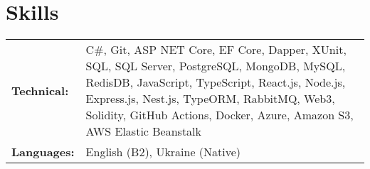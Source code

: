 \section{Skills}\label{sec:skills}

\begin{tabular}{p{}p{}}
    \textbf{Technical:}
    & C\#, Git, ASP NET Core, EF Core, Dapper, XUnit, SQL, SQL Server, PostgreSQL, MongoDB, MySQL, RedisDB,
    JavaScript, TypeScript, React.js, Node.js, Express.js, Nest.js, TypeORM, RabbitMQ,
    Web3, Solidity,
    GitHub Actions, Docker, Azure, Amazon S3, AWS Elastic Beanstalk \\
    \textbf{Languages:}
    & English (B2), \bskip Ukraine (Native)
\end{tabular}